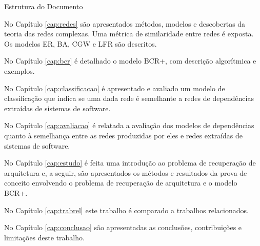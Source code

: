 \begin{section}{Estrutura do Documento}
	
	No Capítulo \ref{cap:redes} são apresentados métodos, modelos e descobertas da teoria das redes complexas. Uma métrica de similaridade entre redes é exposta. Os modelos ER, BA, CGW e LFR são descritos.
	
	No Capítulo \ref{cap:bcr} é detalhado o modelo BCR+, com descrição algorítmica e exemplos.
	
	No Capítulo \ref{cap:classificacao} é apresentado e avaliado um modelo de classificação que indica se uma dada rede é semelhante a redes de dependências extraídas de sistemas de software.
	
	No Capítulo \ref{cap:avaliacao} é relatada a avaliação dos modelos de dependências quanto à semelhança entre as redes produzidas por eles e redes extraídas de sistemas de software.
	
	No Capítulo \ref{cap:estudo} é feita uma introdução ao problema de recuperação de arquitetura e, a seguir, são apresentados os métodos e resultados da prova de conceito envolvendo o problema de recuperação de arquitetura e o modelo BCR+.
	
	No Capítulo \ref{cap:trabrel} este trabalho é comparado a trabalhos relacionados. 
	
	No Capítulo \ref{cap:conclusao} são apresentadas as conclusões, contribuições e limitações deste trabalho.
	
\end{section}
